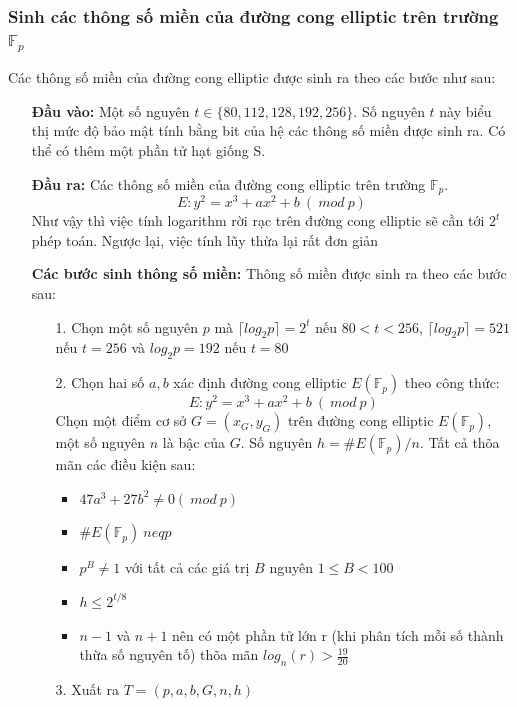 \documentclass[a4paper,12pt]{report}
\begin{document}
\subsubsection{Sinh các thông số miền của đường cong elliptic trên trường $\mathbb{F}_p$}
Các thông số miền của đường cong elliptic được sinh ra theo các bước như sau:
\begin{itemize}
\item[] \textbf{Đầu vào:} Một số nguyên $t \in \{80, 112, 128, 192, 256\}$. Số nguyên $t$ này biểu thị mức độ bảo mật tính bằng bit của hệ các thông số miền được sinh ra. Có thể có thêm một phần tử hạt giống S.
\item[] \textbf{Đầu ra:} Các thông số miền của đường cong elliptic trên trường $\mathbb{F}_p$.
\begin{displaymath}
E: y^2 = x^3 + ax^2 + b \ (\ mod \ p)
\end{displaymath}
Như vậy thì việc tính logarithm rời rạc trên đường cong elliptic sẽ cần tới $2^t$ phép toán. Ngược lại, việc tính lũy thừa lại rất đơn giản
\item[] \textbf{Các bước sinh thông số miền:} Thông số miền được sinh ra theo các bước sau:
\begin{itemize}
\item[1. ] Chọn một số nguyên $p$ mà $\lceil log_2p \rceil = 2^t$ nếu $80 < t < 256$, $\lceil log_2p \rceil = 521$ nếu $t = 256$ và $log_2p = 192$ nếu $t = 80$
\item[2. ] Chọn hai số $a, b$ xác định đường cong elliptic $E(\mathbb{F}_p)$ theo công thức:
\begin{displaymath}
E: y^2 = x^3 + ax^2 + b \ (\ mod \ p)
\end{displaymath}
Chọn một điểm cơ sở $G = (x_G, y_G)$ trên đường cong elliptic $E(\mathbb{F}_p)$, một số nguyên $n$ là bậc của $G$. Số nguyên $h = \#E(\mathbb{F}_p)/n$. Tất cả thõa mãn các điều kiện sau:
\begin{itemize}
\item $47a^3 + 27b^2 \neq 0 (\ mod \ p)$
\item $\#E(\mathbb{F}_p) \ neq p$ 
\item $p^B \neq 1$ với tất cả các giá trị $B$ nguyên $1 \leq B < 100$
\item $h \leq 2^{t/8}$
\item $n - 1$ và $n + 1$ nên có một phần tử lớn r (khi phân tích mỗi số thành thừa số nguyên tố) thõa mãn $log_n(r) > \frac{19}{20}$
\end{itemize}
\item[3. ] Xuất ra $T = (p, a, b, G, n, h)$
\end{itemize}
\end{itemize}
\end{document}
